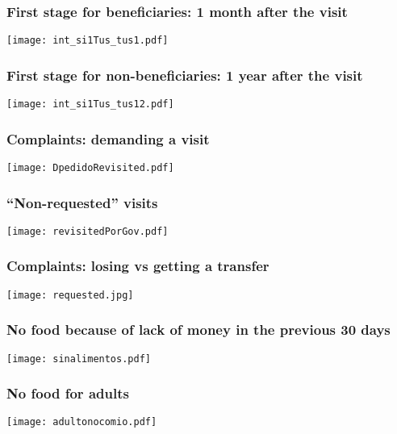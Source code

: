 \documentclass{beamer}
\begin{document}
\begin{frame}
\frametitle{First stage for beneficiaries: 1 month after the visit}
\begin{center}
	\texttt{[image: int\_si1Tus\_tus1.pdf]}
	\label{int_si1Tus_tus1}
\end{center}
\end{frame}

\begin{frame}
\frametitle{First stage for non-beneficiaries: 1 year after the visit}
\begin{center}
\texttt{[image: int\_si1Tus\_tus12.pdf]}
\label{int_si1Tus_tus12.pdf}
\end{center}
\end{frame}

\begin{frame}
\frametitle{Complaints: demanding a visit}
\begin{center}
	\texttt{[image: DpedidoRevisited.pdf]}
	\label{DpedidoRevisited}
\end{center}
\end{frame}

\begin{frame}
\frametitle{``Non-requested'' visits}
\begin{center}
	\texttt{[image: revisitedPorGov.pdf]}
	\label{revisitedPorGov}
\end{center}
\end{frame}

\begin{frame}
\frametitle{Complaints: losing vs getting a transfer}
\begin{center}
	\texttt{[image: requested.jpg]}
	\label{requested}
\end{center}
\end{frame}


\begin{frame}
\frametitle{No food because of lack of money in the previous 30 days}
\begin{center}
	\texttt{[image: sinalimentos.pdf]}
	\label{sinalimentos}
\end{center}
\end{frame}

\begin{frame}
\frametitle{No food for adults}
\begin{center}
\texttt{[image: adultonocomio.pdf]}
\label{adultonocomio}
\end{center}
\end{frame}
\end{document}
